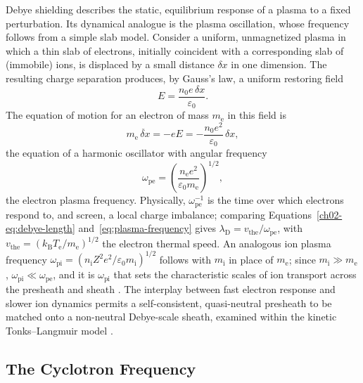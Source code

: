 Debye shielding describes the static, equilibrium response of a plasma to a fixed perturbation. Its dynamical analogue is the plasma oscillation, whose frequency follows from a simple slab model. Consider a uniform, unmagnetized plasma in which a thin slab of electrons, initially coincident with a corresponding slab of (immobile) ions, is displaced by a small distance $\delta x$ in one dimension. The resulting charge separation produces, by Gauss's law, a uniform restoring field
\begin{equation}
E = \frac{n_{0} e\, \delta x}{\varepsilon_{0}}.
\label{eq:slab-field}
\end{equation}
The equation of motion for an electron of mass $m_{\mathrm{e}}$ in this field is
\begin{equation}
m_{\mathrm{e}}\,\ddot{\delta x} = -eE = -\frac{n_{0} e^{2}}{\varepsilon_{0}}\,\delta x,
\label{eq:slab-eom}
\end{equation}
the equation of a harmonic oscillator with angular frequency
\begin{equation}
\omega_{\mathrm{pe}} = \left(\frac{n_{\mathrm{e}} e^{2}}{\varepsilon_{0} m_{\mathrm{e}}}\right)^{1/2},
\label{eq:plasma-frequency}
\end{equation}
the electron plasma frequency. Physically, $\omega_{\mathrm{pe}}^{-1}$ is the time over which electrons respond to, and screen, a local charge imbalance; comparing Equations~\eqref{ch02-eq:debye-length} and~\eqref{eq:plasma-frequency} gives $\lambda_{\mathrm{D}} = v_{\mathrm{the}}/\omega_{\mathrm{pe}}$, with $v_{\mathrm{the}} = (k_{\mathrm{B}} T_{\mathrm{e}}/m_{\mathrm{e}})^{1/2}$ the electron thermal speed. An analogous ion plasma frequency $\omega_{\mathrm{pi}} = (n_{\mathrm{i}} Z^{2} e^{2}/\varepsilon_{0} m_{\mathrm{i}})^{1/2}$ follows with $m_{\mathrm{i}}$ in place of $m_{\mathrm{e}}$; since $m_{\mathrm{i}} \gg m_{\mathrm{e}}$, $\omega_{\mathrm{pi}} \ll \omega_{\mathrm{pe}}$, and it is $\omega_{\mathrm{pi}}$ that sets the characteristic scales of ion transport across the presheath and sheath \cite{ref0023,ref0665}. The interplay between fast electron response and slower ion dynamics permits a self-consistent, quasi-neutral presheath to be matched onto a non-neutral Debye-scale sheath, examined within the kinetic Tonks--Langmuir model \cite{ref0665,ref0666}.

\subsection{The Cyclotron Frequency}

